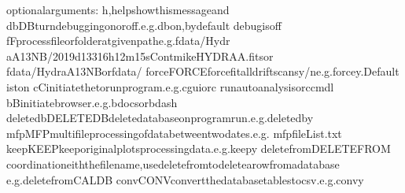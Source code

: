 \documentclass[letterpaper,10pt,english]{sphinxmanual}
\begin{document}
\begin{sphinxVerbatim}[commandchars=\\\{\},numbers=left,firstnumber=1,stepnumber=1]
optionalarguments:
\PYGZhy{}h,\PYGZhy{}\PYGZhy{}helpshowthismessageand
\PYGZhy{}dbDBturndebuggingonoroff.e.g.\PYGZhy{}dbon,bydefault
debugisoff
\PYGZhy{}fFprocessfileorfolderatgivenpathe.g.\PYGZhy{}fdata/Hydr
aA\PYGZus{}13NB/2019d133\PYGZus{}16h12m15s\PYGZus{}Cont\PYGZus{}mike\PYGZus{}HYDRA\PYGZus{}A.fitsor
\PYGZhy{}fdata/HydraA\PYGZus{}13NBor\PYGZhy{}fdata/
\PYGZhy{}forceFORCEforcefitalldriftscansy/ne.g.\PYGZhy{}forcey.Default
iston
\PYGZhy{}cCinitiatethetorunprogram.e.g.\PYGZhy{}cguior\PYGZhy{}c
run\PYGZus{}auto\PYGZus{}analysisor\PYGZhy{}ccmdl
\PYGZhy{}bBinitiatebrowser.e.g.\PYGZhy{}bdocsor\PYGZhy{}bdash
\PYGZhy{}delete\PYGZus{}dbDELETE\PYGZus{}DBdeletedatabaseonprogramrun.e.g.\PYGZhy{}delete\PYGZus{}dby
\PYGZhy{}mfpMFPmulti\PYGZhy{}fileprocessingofdatabetweentwodates.e.g.
\PYGZhy{}mfpfileList.txt
\PYGZhy{}keepKEEPkeeporiginalplotsprocessingdata.e.g.\PYGZhy{}keepy
\PYGZhy{}delete\PYGZus{}fromDELETE\PYGZus{}FROM
coordinationeiththefilename,usedelete\PYGZus{}fromtodeletearowfromadatabase
e.g.delete\PYGZus{}fromCALDB
\PYGZhy{}convCONVconvertthedatabasetablestocsv.e.g.convy
\end{sphinxVerbatim}
\end{document}
